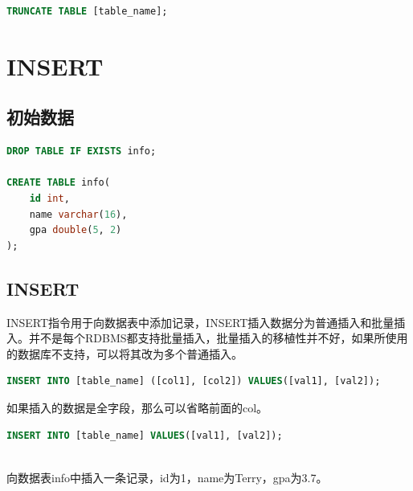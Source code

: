 \documentclass[12pt, openany, oneside]{book}
\begin{document}
\begin{lstlisting}[language=SQL]
TRUNCATE TABLE [table_name];
\end{lstlisting}

\newpage

\chapter{INSERT}

\section{初始数据}


\begin{lstlisting}[language=SQL]
DROP TABLE IF EXISTS info;

CREATE TABLE info(
    id int,
    name varchar(16),
    gpa double(5, 2)
);
\end{lstlisting}

\section{INSERT}

INSERT指令用于向数据表中添加记录，INSERT插入数据分为普通插入和批量插入。并不是每个RDBMS都支持批量插入，批量插入的移植性并不好，如果所使用的数据库不支持，可以将其改为多个普通插入。

\vspace{-0.5cm}

\begin{lstlisting}[language=SQL]
INSERT INTO [table_name] ([col1], [col2]) VALUES([val1], [val2]);
\end{lstlisting}

如果插入的数据是全字段，那么可以省略前面的col。

\vspace{-0.5cm}

\begin{lstlisting}[language=SQL]
INSERT INTO [table_name] VALUES([val1], [val2]);
\end{lstlisting}

\vspace{0.5cm}

 \\

向数据表info中插入一条记录，id为1，name为Terry，gpa为3.7。

\vspace{-0.5cm}
\end{document}
